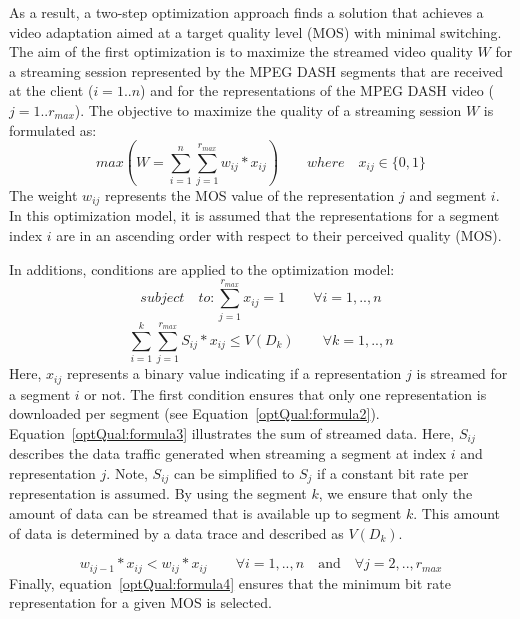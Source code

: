 As a result, a two-step optimization approach finds a solution that achieves a video adaptation aimed at a target quality level (\ac{MOS}) with minimal switching. 
The aim of the first optimization is to maximize the streamed video quality $W$ for a streaming session represented by the \ac{MPEG} \ac{DASH} segments that are received at the client ($i=1 .. n$) and for the representations of the \ac{MPEG} \ac{DASH} video ($j=1..r_{max}$).
The objective to maximize the quality of a streaming session $W$ is formulated as: 
\begin{equation}
\label{optQual:formula1}
max(W = \sum\limits_{i=1}^{n}\sum\limits_{j=1}^{r_{max}} w_{ij} * x_{ij}) \quad\quad where\quad x_{ij} \in \{0,1\}
\end{equation}
The weight $w_{ij}$ represents the \ac{MOS} value of the representation $j$ and segment $i$.
In this optimization model, it is assumed that the representations for a segment index $i$ are in an ascending order with respect to their perceived quality (\ac{MOS}). 

In additions, conditions are applied to the optimization model:
\begin{equation}
\label{optQual:formula2}
subject\quad to: \sum\limits_{j=1}^{r_{max}} x_{ij} = 1 \quad \quad \forall i=1,..,n 
\end{equation}
\begin{equation}
\label{optQual:formula3}
\sum\limits_{i=1}^{k}\sum\limits_{j=1}^{r_{max}} S_{ij} * x_{ij} \leq V(D_k) \quad \quad \forall k=1,..,n 
\end{equation}
Here, $x_{ij}$ represents a binary value indicating if a representation $j$ is streamed for a segment $i$ or not.
The first condition ensures that only one representation is downloaded per segment (see Equation~\ref{optQual:formula2}).
Equation~\ref{optQual:formula3} illustrates the sum of streamed data.
Here, $S_{ij}$ describes the data traffic generated when streaming a segment at index $i$ and representation $j$.
Note, $S_{ij}$ can be simplified to $S_{j}$ if a constant bit rate per representation is assumed.
By using the segment $k$, we ensure that only the amount of data can be streamed that is available up to segment $k$. 
This amount of data is determined by a data trace and described as $V(D_k)$.

\begin{equation}
\label{optQual:formula4}
w_{ij-1}  * x_{ij}  <  w_{ij} * x_{ij} \quad \quad \forall i=1,..,n \quad \mbox{and} \quad \forall j=2,..,r_{max} 
\end{equation}
Finally, equation~\ref{optQual:formula4} ensures that the minimum bit rate representation for a given \ac{MOS} is selected.

